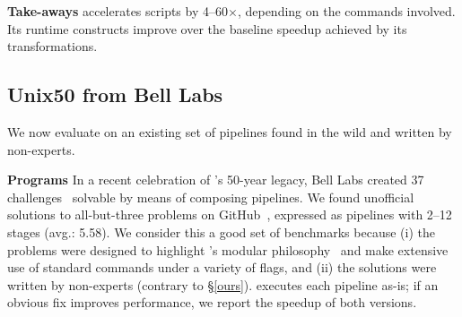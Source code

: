 \documentclass[letterpaper,twocolumn,10pt]{article}
\newcommand{\heading}[1]{\vspace{4pt}\noindent\textbf{#1}\enspace}
\newcommand{\kk}[1]{[{\color{magenta}kk: #1}]}
\begin{document}



\heading{Take-aways}
\sys accelerates scripts by 4--60$\times$, depending on the commands involved.
Its runtime constructs improve over the baseline speedup achieved by its transformations.

\subsection{Unix50 from Bell Labs}
\label{unix50}

We now evaluate \sys on an existing set of \unix pipelines found in the wild and written by non-experts.

\heading{Programs}
In a recent celebration of \unix's 50-year legacy, Bell Labs created 37 challenges~\cite{unix50} solvable by means of composing \unix pipelines.
We found unofficial solutions to all-but-three problems on GitHub~\cite{unix50sol}, expressed as pipelines with 2--12 stages (avg.: 5.58).
We consider this a good set of benchmarks because
  (i) the problems were designed to highlight \unix's modular philosophy~\cite{mcilroy1978unix} and make extensive use of standard commands under a variety of flags, and
  (ii) the solutions were written by non-experts (contrary to \S\ref{ours}).
\sys executes each pipeline as-is; 
  if an obvious fix improves performance, we report the speedup of both versions. %
\end{document}

